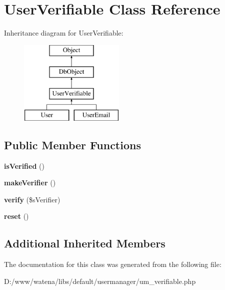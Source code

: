 \hypertarget{class_user_verifiable}{\section{User\-Verifiable Class Reference}
\label{class_user_verifiable}
}
Inheritance diagram for User\-Verifiable\-:\begin{figure}[H]
\begin{center}
\leavevmode
\includegraphics[height=4.000000cm]{class_user_verifiable}
\end{center}
\end{figure}
\subsection*{Public Member Functions}
\begin{DoxyCompactItemize}
\item 
\hypertarget{class_user_verifiable_ac927b336252a8c246cbc71c137b9f0b4}{{\bfseries is\-Verified} ()}\label{class_user_verifiable_ac927b336252a8c246cbc71c137b9f0b4}

\item 
\hypertarget{class_user_verifiable_a0b2e575e6d1a8fed1cebfaadf61200cc}{{\bfseries make\-Verifier} ()}\label{class_user_verifiable_a0b2e575e6d1a8fed1cebfaadf61200cc}

\item 
\hypertarget{class_user_verifiable_a98ce817b78a952644e4fddfd3f6bd631}{{\bfseries verify} (\$s\-Verifier)}\label{class_user_verifiable_a98ce817b78a952644e4fddfd3f6bd631}

\item 
\hypertarget{class_user_verifiable_aa70e5d65eab29f974b2dfde3b1fc8692}{{\bfseries reset} ()}\label{class_user_verifiable_aa70e5d65eab29f974b2dfde3b1fc8692}

\end{DoxyCompactItemize}
\subsection*{Additional Inherited Members}


The documentation for this class was generated from the following file\-:\begin{DoxyCompactItemize}
\item 
D\-:/www/watena/libs/default/usermanager/um\-\_\-verifiable.\-php\end{DoxyCompactItemize}
